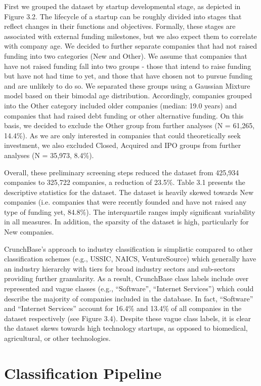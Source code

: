 \documentclass[../thesis/thesis.tex]{subfiles}
\begin{document}
First we grouped the dataset by startup developmental stage, as depicted in Figure 3.2. The lifecycle of a startup can be roughly divided into stages that reflect changes in their functions and objectives. Formally, these stages are associated with external funding milestones, but we also expect them to correlate with company age. We decided to further separate companies that had not raised funding into two categories (New and Other). We assume that companies that have not raised funding fall into two groups - those that intend to raise funding but have not had time to yet, and those that have chosen not to pursue funding and are unlikely to do so. We separated these groups using a Gaussian Mixture model based on their bimodal age distribution. Accordingly, companies grouped into the Other category included older companies (median: 19.0 years) and companies that had raised debt funding or other alternative funding. On this basis, we decided to exclude the Other group from further analyses (N = 61,265, 14.4\%). As we are only interested in companies that could theoretically seek investment, we also excluded Closed, Acquired and IPO groups from further analyses (N = 35,973, 8.4\%).

Overall, these preliminary screening steps reduced the dataset from 425,934 companies to 325,722 companies, a reduction of 23.5\%. Table 3.1 presents the descriptive statistics for the dataset. The dataset is heavily skewed towards New companies (i.e. companies that were recently founded and have not raised any type of funding yet, 84.8\%). The interquartile ranges imply significant variability in all measures. In addition, the sparsity of the dataset is high, particularly for New companies.

CrunchBase’s approach to industry classification is simplistic compared to other classification schemes (e.g., USSIC, NAICS, VentureSource) which generally have an industry hierarchy with tiers for broad industry sectors and sub-sectors providing further granularity. As a result, CrunchBase class labels include over represented and vague classes (e.g., “Software”, “Internet Services”) which could describe the majority of companies included in the database. In fact, “Software” and “Internet Services” account for 16.4\% and 13.4\% of all companies in the dataset respectively (see Figure 3.4). Despite these vague class labels, it is clear the dataset skews towards high technology startups, as opposed to biomedical, agricultural, or other technologies.

\section{Classification Pipeline}
\end{document}
